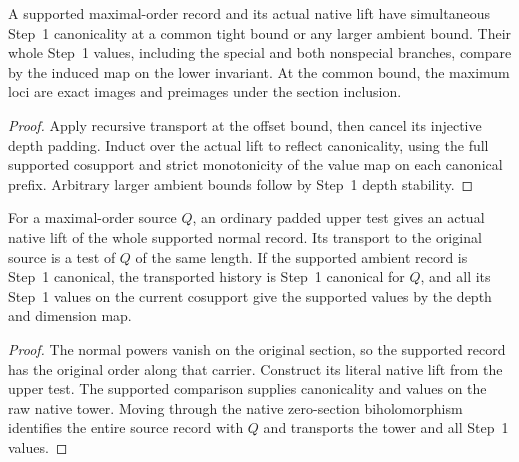 \begin{theorem}
\label{hir:g1-supported-step-one-values-can}
\leanok
A supported maximal-order record and its actual native lift have
simultaneous Step~1 canonicality at a common tight bound or any
larger ambient bound. Their whole Step~1 values, including the
special and both nonspecial branches, compare by the induced map
on the lower invariant. At the common bound, the maximum loci are
exact images and preimages under the section inclusion.
\end{theorem}
\begin{proof}
Apply recursive transport at the offset bound, then cancel its
injective depth padding. Induct over the actual lift to reflect
canonicality, using the full supported cosupport and strict
monotonicity of the value map on each canonical prefix. Arbitrary
larger ambient bounds follow by Step~1 depth stability.
\end{proof}


\begin{theorem}
\label{hir:g1-literal-supported-step-one}
\leanok
For a maximal-order source $Q$, an ordinary padded upper test gives
an actual native lift of the whole supported normal record. Its
transport to the original source is a test of $Q$ of the same length.
If the supported ambient record is Step~1 canonical, the transported
history is Step~1 canonical for $Q$, and all its Step~1 values on the
current cosupport give the supported values by the depth and dimension
map.
\end{theorem}
\begin{proof}
The normal powers vanish on the original section, so the supported
record has the original order along that carrier. Construct its
literal native lift from the upper test. The supported comparison
supplies canonicality and values on the raw native tower. Moving
through the native zero-section biholomorphism identifies the entire
source record with $Q$ and transports the tower and all Step~1 values.
\end{proof}


